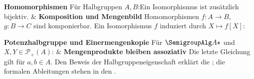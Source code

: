 \begin{BandUebersicht}
\textbf{Homomorphismen}
Für Halbgruppen \(A,B\):Ein Isomorphismus ist zusätzlich bijektiv.
&
\textbf{Komposition und Mengenbild}
Homomorphismen \(f:A\to B\), \(g:B\to C\) sind komponierbar.
Ein Isomorphismus \(f\) induziert durch \(X\mapsto f[X]\):
 \\
\addlinespace[.8ex]

\textbf{Potenzhalbgruppe und Einermengenkopie}
Für \(\SemigroupAlg A\star\) und \(X,Y\in\mathcal P_+(A)\):
&
\textbf{Mengenprodukte bleiben assoziativ}
Die letzte Gleichung gilt für \(a,b\in A\).
Den Beweis der Halbgruppeneigenschaft erklärt die \PowerReadingLink{};
die formalen Ableitungen stehen in den \PowerProofsLink{}.
 \\
\addlinespace[.8ex]


\end{BandUebersicht}
